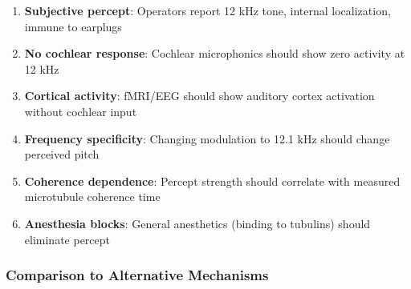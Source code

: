 \begin{enumerate}
\def\labelenumi{\arabic{enumi}.}
\tightlist
\item
  \textbf{Subjective percept}: Operators report 12 kHz tone, internal
  localization, immune to earplugs
\item
  \textbf{No cochlear response}: Cochlear microphonics should show zero
  activity at 12 kHz
\item
  \textbf{Cortical activity}: fMRI/EEG should show auditory cortex
  activation without cochlear input
\item
  \textbf{Frequency specificity}: Changing modulation to 12.1 kHz should
  change perceived pitch
\item
  \textbf{Coherence dependence}: Percept strength should correlate with
  measured microtubule coherence time
\item
  \textbf{Anesthesia blocks}: General anesthetics (binding to tubulins)
  should eliminate percept
\end{enumerate}

\subsubsection{Comparison to Alternative
Mechanisms}\label{comparison-to-alternative-mechanisms}

